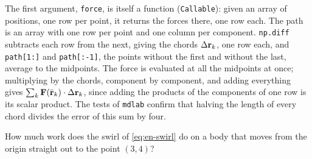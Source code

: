 The first argument, \texttt{force}, is itself a function
(\texttt{Callable}): given an array of positions, one row per point, it
returns the forces there, one row each. The path is an array with one row
per point and one column per component. \texttt{np.diff} subtracts each row from the next, giving the
chords $\Delta\bm{\mathrm{r}}_k$, one row each, and \texttt{path[1:]} and
\texttt{path[:-1]}, the points without the first and without the last,
average to the midpoints. The force is evaluated at all the midpoints at
once; multiplying by the chords, component by component, and adding
everything gives $\sum_k\bm{\mathrm{F}}(\bar{\bm{\mathrm{r}}}_k)\cdot\Delta\bm{\mathrm{r}}_k$, since
adding the products of the components of one row is its scalar product.
The tests of \texttt{mdlab} confirm that halving the length of every
chord divides the error of this sum by four.


\begin{selfcheck}
How much work does the swirl of \cref{eq:en-swirl} do on a body that moves
from the origin straight out to the point $(3, 4)$?
\end{selfcheck}
